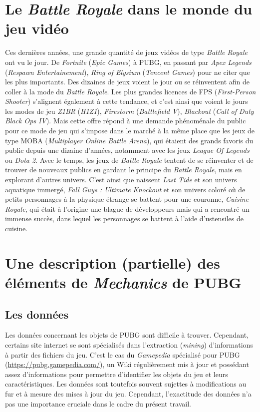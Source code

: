 \section{Le \emph{Battle Royale} dans le monde du jeu vidéo}
Ces dernières années, une grande quantité de jeux vid\'eos de type \emph{Battle Royale} ont vu le jour. De \emph{Fortnite} (\emph{Epic Games}) à PUBG, en passant par \emph{Apex Legends} (\emph{Respawn Entertainement}), \emph{Ring of Elysium} (\emph{Tencent Games}) pour ne citer que les plus importants. Des dizaines de jeux voient le jour ou se réinventent afin de coller à la mode du \emph{Battle Royale}. Les plus grandes licences de FPS (\emph{First-Person Shooter}) s'alignent également à cette tendance, et c'est ainsi que voient le jours les modes de jeu \emph{Z1BR} (\emph{H1Z1}), \emph{Firestorm} (\emph{Battlefield V}), \emph{Blackout} (\emph{Call of Duty Black Ops IV}). Mais cette offre répond à une demande phénoménale du public pour ce mode de jeu qui s'impose dans le marché à la même place que les jeux de type MOBA (\emph{Multiplayer Online Battle Arena}), qui étaient des grands favoris du public depuis une dizaine d'années, notamment avec les jeux \emph{League Of Legends} ou \emph{Dota 2}. Avec le temps, les jeux de \emph{Battle Royale} tentent de se réinventer et de trouver de nouveaux publics en gardant le principe du \emph{Battle Royale}, mais en explorant d'autres univers. C'est ainsi que naissent \emph{Last Tide} et son univers aquatique immergé, \emph{Fall Guys : Ultimate Knockout} et son univers coloré où de petits personnages à la physique étrange se battent pour une couronne, \emph{Cuisine Royale}, qui était à l'origine une blague de développeurs mais qui a rencontré un immense succès, dans lequel les personnages se battent à l'aide d'ustensiles de cuisine.

\section{Une description (partielle) des \'el\'ements de \emph{Mechanics} de PUBG}
\subsection{Les données}
Les données concernant les objets de PUBG sont difficile à trouver.
Cependant, certains site internet se sont spécialisés dans l'extraction (\emph{mining}) d'informations à partir des fichiers du jeu.
C'est le cas du \emph{Gamepedia} spécialisé pour PUBG (\url{https://pubg.gamepedia.com/}),
un Wiki régulièrement mis à jour et possédant assez d'informations pour permettre d'identifier les objets du jeu et leurs caractéristiques.
Les données sont toutefois souvent sujettes à modifications au fur et à mesure des mises à jour du jeu.
Cependant, l'exactitude des données n'a pas une importance cruciale dans le cadre du pr\'esent travail.


